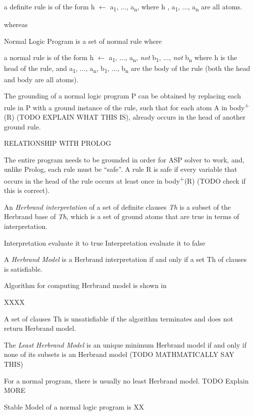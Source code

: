 \documentclass[12pt,twoside]{report}
\begin{document}
a definite rule is of the form h $\leftarrow$ a\textsubscript{1}, ..., a\textsubscript{n}, where h , a\textsubscript{1}, ..., a\textsubscript{n} are all atoms.

whereas

Normal Logic Program is a set of normal rule where

a normal rule is of the form h $\leftarrow$ a\textsubscript{1}, ..., a\textsubscript{n}, \textit{not} b\textsubscript{1}, ..., \textit{not}  b\textsubscript{n} where h is the head of the rule,
 and a\textsubscript{1}, ..., a\textsubscript{n}, b\textsubscript{1}, ..., b\textsubscript{n} are the body of the rule (both the head and body are all atoms).


The grounding of a normal logic program P can be obtained by replacing each rule in P with a ground instance of the rule, such that for each atom A in body\textsuperscript{+} (R) (TODO EXPLAIN WHAT THIS IS), already occurs in the head of another ground rule.


RELATIONSHIP WITH PROLOG

The entire program needs to be grounded in order for ASP solver to work, and, unlike Prolog,  each rule must be \enquote{safe}. A rule R is safe if every variable that occurs in the head of the rule occurs at least once in body\textsuperscript{+}(R) (TODO check if this is correct).

An \textit{Herbrand interpretation} of a set of definite clauses \textit{Th} is a subset of the Herbrand base of \textit{Th}, which is a set of ground atoms that are true in terms of interpretation.



Interpretation evaluate it to true
Interpretation evaluate it to false

A \textit{Herbrand Model} is a Herbrand interpretation if and only if a set Th of clauses is satisfiable.


Algorithm for computing Herbrand model is shown in

XXXX

A set of clauses Th is unsatisfiable if the algorithm terminates and does not return Herbrand model.

The \textit{Least Herbrand Model} is an unique minimum Herbrand model if and only if none of its subsets is an Herbrand model (TODO MATHMATICALLY SAY THIS)

For a normal program, there is usually no least Herbrand model.
TODO Explain MORE

Stable Model of a normal logic program is XX
\cite{Gelfond1988}
\end{document}
